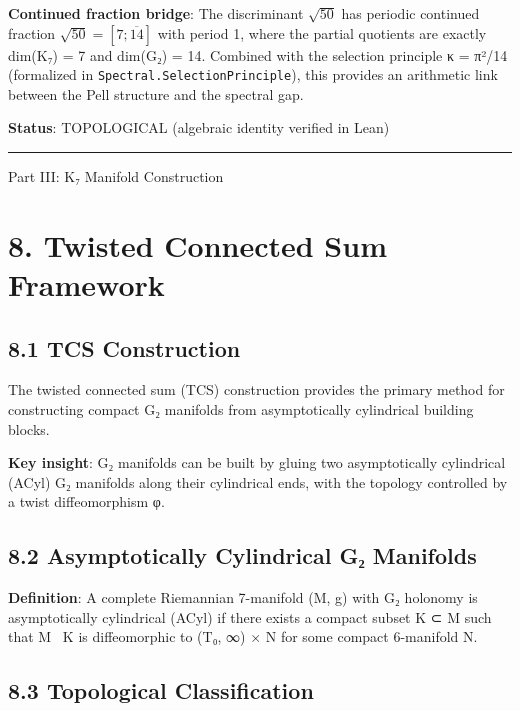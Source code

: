 \documentclass[11pt,a4paper]{article}
\begin{document}
\textbf{Continued fraction bridge}: The discriminant \(\sqrt{50}\) has periodic continued fraction \(\sqrt{50} = [7; \overline{14}]\) with period 1, where the partial quotients are exactly dim(K₇) = 7 and dim(G₂) = 14. Combined with the selection principle κ = π²/14 (formalized in \texttt{Spectral.\allowbreak{}Selection\allowbreak{}Principle}), this provides an arithmetic link between the Pell structure and the spectral gap.

\textbf{Status}: TOPOLOGICAL (algebraic identity verified in Lean)

\begin{center}\rule{\linewidth}{0.5pt}\end{center}

Part III: K₇ Manifold Construction

\section{8. Twisted Connected Sum Framework}\label{twisted-connected-sum-framework}

\subsection{8.1 TCS Construction}\label{tcs-construction}

The twisted connected sum (TCS) construction provides the primary method for constructing compact G₂ manifolds from asymptotically cylindrical building blocks.

\textbf{Key insight}: G₂ manifolds can be built by gluing two asymptotically cylindrical (ACyl) G₂ manifolds along their cylindrical ends, with the topology controlled by a twist diffeomorphism φ.

\subsection{8.2 Asymptotically Cylindrical G₂ Manifolds}\label{asymptotically-cylindrical-gux2082-manifolds}

\textbf{Definition}: A complete Riemannian 7-manifold (M, g) with G₂ holonomy is asymptotically cylindrical (ACyl) if there exists a compact subset K ⊂ M such that M ~K is diffeomorphic to (T₀, ∞) × N for some compact 6-manifold N.

\subsection{8.3 Topological Classification}\label{topological-classification}
\end{document}
